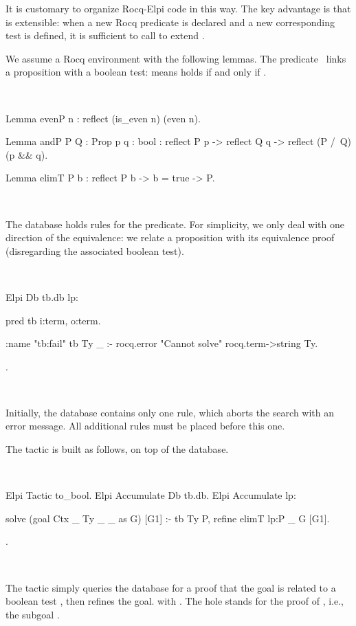 \documentclass[a4paper, 11pt]{book}
\newenvironment{rocqcode}
  {\VerbatimEnvironment~\\\begin{rocqbox}\begin{xrocqcode}}{\end{xrocqcode}
\end{rocqbox}\\}
\begin{document}
It is customary to organize Rocq-Elpi code in this way. The key advantage is that
 is extensible: when a new Rocq predicate is declared and a new
corresponding test is defined, it is sufficient to call
 to extend .



We assume a Rocq environment with the following lemmas. The 
predicate~\cite{assia_mahboubi_2022_7118596} links a proposition with a boolean test:  means
 holds if and only if .

\begin{rocqcode}
Lemma evenP n : reflect (is_even n) (even n).

Lemma andP  {P Q : Prop} {p q : bool} :
  reflect P p -> reflect Q q -> reflect (P /\ Q) (p && q).

Lemma elimT {P b} :
  reflect P b -> b = true -> P.
\end{rocqcode}



The database holds rules for the  predicate. For simplicity, we only
deal with one direction of the equivalence: we relate a proposition with its
equivalence proof (disregarding the associated boolean test).

\begin{rocqcode}
Elpi Db tb.db lp:{{

pred tb i:term, o:term.

:name "tb:fail"
tb Ty _ :- rocq.error "Cannot solve" {rocq.term->string Ty}.

}}.
\end{rocqcode}


Initially, the database contains only one rule, which aborts the search with
an error message. All additional rules must be placed before this one.


The  tactic is built as follows, on top of the database.

\begin{rocqcode}
Elpi Tactic to_bool.
Elpi Accumulate Db tb.db.
Elpi Accumulate lp:{{

solve (goal Ctx _ Ty _ _ as G) [G1] :-
  tb Ty P,
  refine {{ elimT lp:P _ }} G [G1].

}}.
\end{rocqcode}


The tactic simply queries the database for a proof  that the goal is
related to a boolean test , then refines the goal.
with . The hole stands for the proof
of , i.e., the subgoal .
\end{document}
